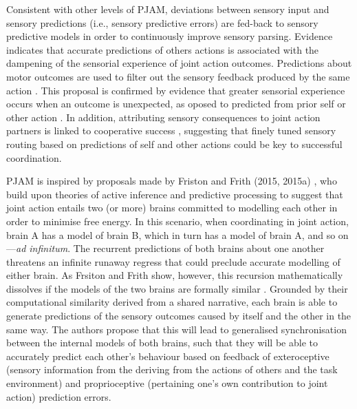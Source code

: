 \begin{CJK}{UTF8}{gbsn}
Consistent with other levels of PJAM, deviations between sensory input and sensory predictions (i.e., sensory predictive errors) are fed-back to sensory predictive models in order to continuously improve sensory parsing.  Evidence indicates that accurate predictions of others actions is associated with the dampening of the sensorial experience of joint action outcomes.  Predictions about motor outcomes are used to filter out the sensory feedback produced by the same action \citep{Blakemore1999}.  This proposal is confirmed by evidence that greater sensorial experience occurs when an outcome is unexpected, as oposed to predicted from prior self or other action \citep{Sato2008}.  In addition, attributing sensory consequences to joint action partners is linked to cooperative success \citep{Chaminade2012}, suggesting that finely tuned sensory routing based on predictions of self and other actions could be key to successful coordination.

PJAM is inspired by proposals made by Friston and Frith (2015, 2015a) \citep{Friston2015,Friston2015a}, who build upon theories of active inference and predictive processing to suggest that joint action entails two (or more) brains committed to modelling each other in order to minimise free energy.  In this scenario, when coordinating in joint action, brain A has a model of brain B, which in turn has a model of brain A, and so on---\textit{ad infinitum}.  The recurrent predictions of both brains about one another threatens an infinite runaway regress that could preclude accurate modelling of either brain.  As Frsiton and Frith show, however, this recursion mathematically dissolves if the models of the two brains are formally similar \citep{Friston2015}.  Grounded by their computational similarity derived from a shared narrative, each brain is able to generate predictions of the sensory outcomes caused by itself and the other in the same way.  The authors propose that this will lead to generalised synchronisation between the internal models of both brains, such that they will be able to accurately predict each other's behaviour based on feedback of exteroceptive (sensory information from the deriving from the actions of others and the task environment) and proprioceptive (pertaining one's own contribution to joint action) prediction errors.


\end{CJK}
